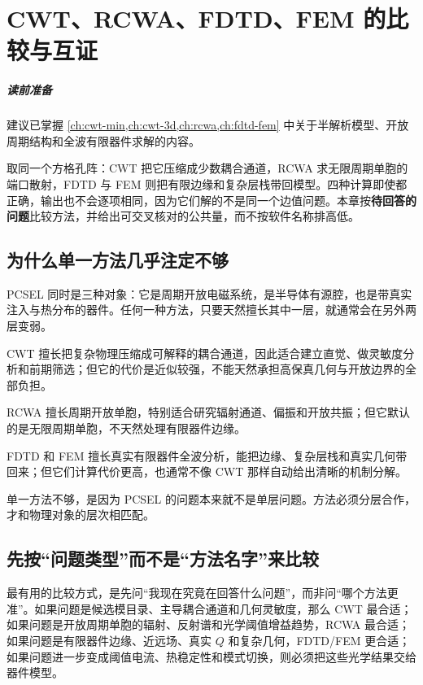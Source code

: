 \chapter{CWT、RCWA、FDTD、FEM 的比较与互证}
\label{ch:method-compare}

\paragraph{读前准备}
建议已掌握 \cref{ch:cwt-min,ch:cwt-3d,ch:rcwa,ch:fdtd-fem} 中关于半解析模型、开放周期结构和全波有限器件求解的内容。

取同一个方格孔阵：CWT 把它压缩成少数耦合通道，RCWA 求无限周期单胞的端口散射，FDTD 与 FEM 则把有限边缘和复杂层栈带回模型。四种计算即使都正确，输出也不会逐项相同，因为它们解的不是同一个边值问题。本章按\textbf{待回答的问题}比较方法，并给出可交叉核对的公共量，而不按软件名称排高低。

\section{为什么单一方法几乎注定不够}
PCSEL 同时是三种对象：它是周期开放电磁系统，是半导体有源腔，也是带真实注入与热分布的器件。任何一种方法，只要天然擅长其中一层，就通常会在另外两层变弱。

CWT 擅长把复杂物理压缩成可解释的耦合通道，因此适合建立直觉、做灵敏度分析和前期筛选；但它的代价是近似较强，不能天然承担高保真几何与开放边界的全部负担。

RCWA 擅长周期开放单胞，特别适合研究辐射通道、偏振和开放共振；但它默认的是无限周期单胞，不天然处理有限器件边缘。

FDTD 和 FEM 擅长真实有限器件全波分析，能把边缘、复杂层栈和真实几何带回来；但它们计算代价更高，也通常不像 CWT 那样自动给出清晰的机制分解。

单一方法不够，是因为 PCSEL 的问题本来就不是单层问题。方法必须分层合作，才和物理对象的层次相匹配。

\section{先按“问题类型”而不是“方法名字”来比较}
最有用的比较方式，是先问“我现在究竟在回答什么问题”，而非问“哪个方法更准”。如果问题是候选模目录、主导耦合通道和几何灵敏度，那么 CWT 最合适；如果问题是开放周期单胞的辐射、反射谱和光学阈值增益趋势，RCWA 最合适；如果问题是有限器件边缘、近远场、真实 $Q$ 和复杂几何，FDTD/FEM 更合适；如果问题进一步变成阈值电流、热稳定性和模式切换，则必须把这些光学结果交给器件模型。

